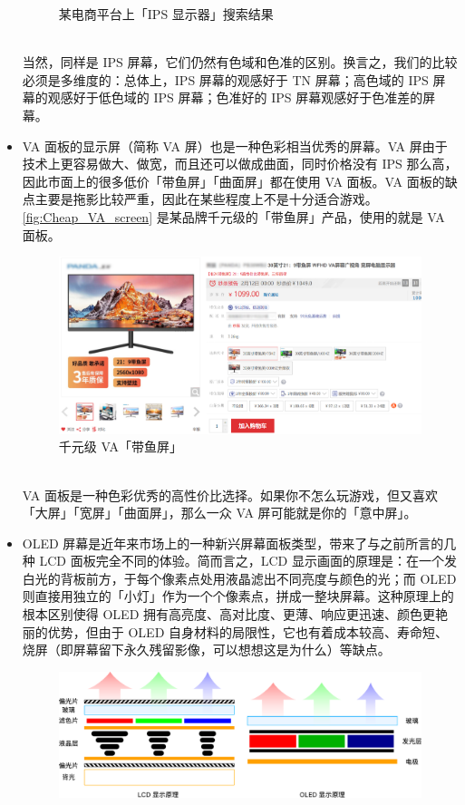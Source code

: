 \begin{itemize}
\begin{figure}[htb!]
      \caption{某电商平台上「IPS 显示器」搜索结果}
      \label{fig:IPS_screens}
    \end{figure}\\
    当然，同样是 IPS 屏幕，它们仍然有色域和色准的区别。换言之，我们的比较必须是多维度的：总体上，IPS 屏幕的观感好于 TN 屏幕；高色域的 IPS 屏幕的观感好于低色域的 IPS 屏幕；色准好的 IPS 屏幕观感好于色准差的屏幕。
  \item VA 面板的显示屏（简称 VA 屏）也是一种色彩相当优秀的屏幕。VA 屏由于技术上更容易做大、做宽，而且还可以做成曲面，同时价格没有 IPS 那么高，因此市面上的很多低价「带鱼屏」「曲面屏」都在使用 VA 面板。VA 面板的缺点主要是拖影比较严重，因此在某些程度上不是十分适合游戏。\autoref{fig:Cheap_VA_screen} 是某品牌千元级的「带鱼屏」产品，使用的就是 VA 面板。
    \begin{figure}[htb!]
      \centering
      \includegraphics[width=.8\textwidth]{assets/advanced/Cheap_VA_screen.png}
      \caption{千元级 VA「带鱼屏」}
      \label{fig:Cheap_VA_screen}
    \end{figure}\\
    VA 面板是一种色彩优秀的高性价比选择。如果你不怎么玩游戏，但又喜欢「大屏」「宽屏」「曲面屏」，那么一众 VA 屏可能就是你的「意中屏」。
  \item OLED 屏幕是近年来市场上的一种新兴屏幕面板类型，带来了与之前所言的几种 LCD 面板完全不同的体验。简而言之，LCD 显示画面的原理是：在一个发白光的背板前方，于每个像素点处用液晶滤出不同亮度与颜色的光；而 OLED 则直接用独立的「小灯」作为一个个像素点，拼成一整块屏幕。这种原理上的根本区别使得 OLED 拥有高亮度、高对比度、更薄、响应更迅速、颜色更艳丽的优势，但由于 OLED 自身材料的局限性，它也有着成本较高、寿命短、烧屏（即屏幕留下永久残留影像，可以想想这是为什么）等缺点。
    \begin{figure}[htb!]
      \centering
      \includegraphics[width=.95\textwidth]{assets/advanced/LCD_OLED.pdf}

\end{figure}
\end{itemize}
